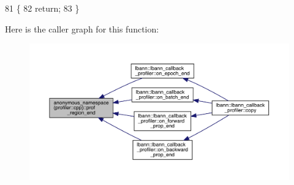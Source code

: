 \begin{DoxyCode}
81                                            \{
82   \textcolor{keywordflow}{return};
83 \}
\end{DoxyCode}
Here is the caller graph for this function\+:\nopagebreak
\begin{figure}[H]
\begin{center}
\leavevmode
\includegraphics[width=350pt]{namespaceanonymous__namespace_02profiler_8cpp_03_a7984c26fb186307873a2f83f91715a99_icgraph}
\end{center}
\end{figure}
